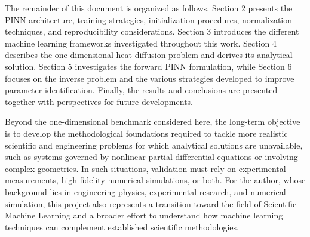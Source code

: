The remainder of this document is organized as follows. Section 2 presents the PINN architecture, training strategies, initialization procedures, normalization techniques, and reproducibility considerations. Section 3 introduces the different machine learning frameworks investigated throughout this work. Section 4 describes the one-dimensional heat diffusion problem and derives its analytical solution. Section 5 investigates the forward PINN formulation, while Section 6 focuses on the inverse problem and the various strategies developed to improve parameter identification. Finally, the results and conclusions are presented together with perspectives for future developments.

Beyond the one-dimensional benchmark considered here, the long-term objective is to develop the methodological foundations required to tackle more realistic scientific and engineering problems for which analytical solutions are unavailable, such as systems governed by nonlinear partial differential equations or involving complex geometries. In such situations, validation must rely on experimental measurements, high-fidelity numerical simulations, or both. For the author, whose background lies in engineering physics, experimental research, and numerical simulation, this project also represents a transition toward the field of Scientific Machine Learning and a broader effort to understand how machine learning techniques can complement established scientific methodologies.
